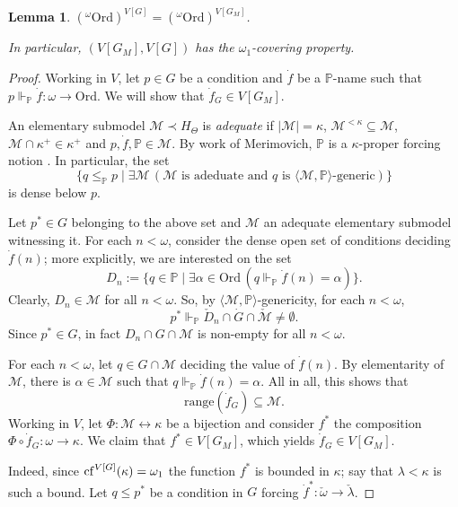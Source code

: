 \documentclass[11pt]{amsart}
\newtheorem{lemma}[theorem]{Lemma}
\theoremstyle{definition}
\theoremstyle{remark}
\newcommand{\cf}{{\rm cf}}
\def\s{\subseteq}
\def\forces{\Vdash}
\begin{document}
 
 \begin{lemma}
$({}^\omega \mathrm{Ord})^{V[G]}=({}^\omega \mathrm{Ord})^{V[G_M]}$.
 
    In particular,  $(V[G_ M],V[G])$ has the $\omega_1$-covering property.
 \end{lemma}
 \begin{proof}
     Working in $V$, let $p\in G$ be a condition and $\dot{f}$  be a $\mathbb{P}$-name such that $p\forces_{\mathbb{P}}\dot{f}\colon \omega\rightarrow \mathrm{Ord}$. We will show that $\dot{f}_G\in V[G_M]$. %

\smallskip

 An elementary submodel $\mathcal{M}\prec H_\Theta$ is \emph{adequate} if $|\mathcal{M}|=\kappa$, $\mathcal{M}^{<\kappa}\s \mathcal{M}$, $\mathcal{M}\cap \kappa^+\in \kappa^+$ and $p, \dot{f}, \mathbb{P}\in \mathcal{M}$. By work of Merimovich, $\mathbb{P}$ is a $\kappa$-proper forcing notion \cite[Lemma 4.13]{Merimovich}. In particular, the set
$$\{q\leq_{\mathbb{P}} p\mid \exists \mathcal{M}\, (\text{$\mathcal{M}$ is adeduate and $q$ is $\langle \mathcal{M}, \mathbb{P}\rangle$-generic})\}$$
is dense below $p.$ 

Let $p^*\in G$ belonging to the above set and $\mathcal{M}$ an adequate elementary submodel witnessing it. For each $n<\omega$, consider the dense open set of conditions deciding $\dot{f}(n)$; more explicitly, we are interested on the  set
$$D_n:=\{q\in \mathbb{P}\mid \exists\alpha\in \mathrm{Ord}\, (q\forces_{\mathbb{P}}\dot{f}(n)=\alpha)\}.$$
Clearly, $D_n\in \mathcal{M}$ for all $n<\omega$. So, by $\langle \mathcal{M}, \mathbb{P}\rangle$-genericity, for each $n<\omega$,
$$p^*\forces_{\mathbb{P}}\check{D}_n\cap \dot{G}\cap \check{\mathcal{M}}\neq \emptyset.$$
Since $p^*\in G$, in fact $D_n\cap G\cap \mathcal{M}$ is non-empty for all $n<\omega$. 

For each $n<\omega$, let $q\in G\cap \mathcal{M}$ deciding the value of $\dot{f}(n)$. By elementarity of $\mathcal{M}$, there is $\alpha\in \mathcal{M}$ such that $q\forces_{\mathbb{P}}\dot{f}(n)=\alpha.$ All in all, this shows that 
$$\text{range}(\dot{f}_G)\s \mathcal{M}.$$
Working in $V$, let $\Phi\colon \mathcal{M}\leftrightarrow \kappa$ be a bijection and consider $f^*$ the composition $\Phi\circ \dot{f}_G\colon \omega\rightarrow \kappa$. We claim that $f^*\in V[G_M]$, which yields $\dot{f}_G\in V[G_M]$.

Indeed, since $\cf^{V[G]}(\kappa)=\omega_1$ the function $f^*$ is bounded in $\kappa$; say that $\lambda<\kappa$ is such a bound. Let $q\leq p^*$ be a condition in $G$ forcing $\dot{f}^*\colon \check{\omega}\to \check{\lambda}$.


\end{proof}
\end{document}
